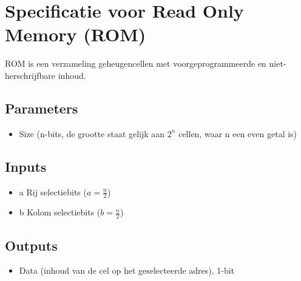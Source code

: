 \documentclass{article}
\begin{document}
\section{Specificatie voor Read Only Memory (ROM)}
ROM is een verzameling geheugencellen met voorgeprogrammeerde en niet-herschrijfbare inhoud.
\subsection{Parameters}
\begin{itemize}
\item Size (n-bits, de grootte staat gelijk aan $2^{n}$ cellen, waar n een even getal is)
\end{itemize}
\subsection{Inputs}
\begin{itemize}
\item a Rij selectiebits ($a=\frac{n}{2}$)
\item b Kolom selectiebits ($b=\frac{n}{2}$)
\end{itemize}
\subsection{Outputs}
\begin{itemize}
\item Data (inhoud van de cel op het geselecteerde adres), 1-bit
\end{itemize}
\end{document}
